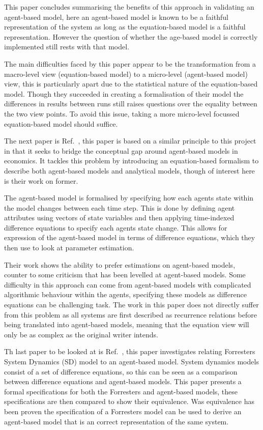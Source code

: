 \documentclass{article}
\begin{document}
This paper concludes summarising the benefits of this approach in validating an agent-based model, here an agent-based model is known to be a faithful representation of the system as long as the equation-based model is a faithful representation. However the question of whether the age-based model is correctly implemented still rests with that model. 

The main difficulties faced by this paper appear to be the transformation from a macro-level view (equation-based model) to a micro-level (agent-based model) view, this is particularly apart due to the statistical nature of the equation-based model. Though they succeeded in creating a formalisation of their model the differences in results between runs still raises questions over the equality between the two view points. To avoid this issue, taking a more micro-level focussed equation-based model should suffice.

The next paper is Ref.~\cite{econmistsnoabm}, this paper is based on a similar principle to this project in that it seeks to bridge the conceptual gap around  agent-based models in economics. It tackles this problem by introducing an equation-based formalism to describe both agent-based models and analytical models, though of interest here is their work on former. 

The agent-based model is formalised by specifying how each agent\textsc{}s state within the model changes between each time step. This is done by defining agent attributes using vectors of state variables and then applying time-indexed difference equations to specify each agents state change. This allows for expression of the agent-based model in terms of difference equations, which they then use to look at parameter estimation. 

Their work shows the ability to prefer estimations on agent-based models, counter to some criticism that has been levelled at agent-based models. Some difficulty in this approach can come from agent-based models with complicated algorithmic behaviour within the agents, specifying these models as difference equations can be challenging task. The work in this paper does not directly suffer from this problem as all systems are first described as recurrence relations before being translated into agent-based models, meaning that the equation view will only be as complex as the original writer intends.  

Th last paper to be looked at is Ref.~\cite{abmtsd}, this paper investigates relating Forrester\textsc{}s System Dynamics (SD) model to an agent-based model. System dynamics models consist of a set of difference equations, so this can be seen as a comparison between difference equations and agent-based models. This paper presents a formal specifications for both the Forrester\textsc{}s and agent-based models, these specifications are then compared to show their equivalence. Was equivalence has been proven the specification of a Forrester\textsc{}s model can be used to derive an agent-based model that is an correct representation of the same system.
\end{document}
